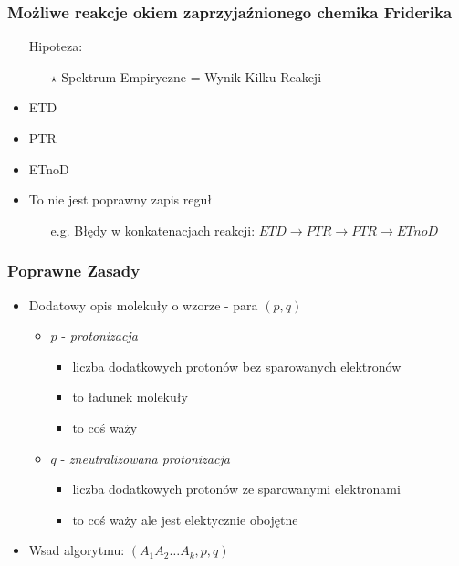 \documentclass[xetex]{beamer}
\begin{document}
	\begin{frame}\frametitle{Możliwe reakcje okiem zaprzyjaźnionego chemika Friderika}
		\begin{itemize}
			\item[] Hipoteza:
			\begin{itemize}
				\item[$\star$] Spektrum Empiryczne = Wynik Kilku Reakcji
			\end{itemize}
			\item ETD
			\begin{center}
			\end{center}
			\item PTR
			\begin{center}
			\end{center}			
			\item ETnoD
			\begin{center}
			\end{center}			
			\item To nie jest poprawny zapis reguł
			\begin{itemize}
			 	\item[e.g.] Błędy w konkatenacjach reakcji: $ETD \rightarrow PTR \rightarrow PTR \rightarrow ETnoD$  
			\end{itemize} 			
		\end{itemize}
	\end{frame}

	\begin{frame}\frametitle{Poprawne Zasady}
		
		\begin{itemize}
			\item Dodatowy opis molekuły o wzorze \molecule - para $(p,q)$
			\begin{itemize}
				\item $p$ - {\it protonizacja}
				\begin{itemize}
					\item liczba dodatkowych protonów bez sparowanych elektronów
					\item to ładunek molekuły
					\item to coś waży
				\end{itemize}
				\item $q$ - {\it zneutralizowana protonizacja}
				\begin{itemize}
					\item liczba dodatkowych protonów ze sparowanymi elektronami
					\item to coś waży ale jest elektycznie obojętne
				\end{itemize}				
			\end{itemize}
			\item Wsad algorytmu: $(A_1 A_2 \dots A_k, p , q)$ 
		\end{itemize}
	\end{frame}
\end{document}
